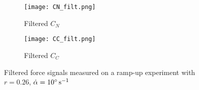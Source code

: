 \begin{figure}[h]
	\begin{subfigure}{.5\textwidth}
		\texttt{[image: CN\_filt.png]}
		\caption{Filtered $C_N$}
		\label{fig:CN_filt}
	\end{subfigure}%
	\begin{subfigure}{.5\textwidth}
		\texttt{[image: CC\_filt.png]}
		\caption{Filtered $C_C$}
		\label{fig:CC_filt}
	\end{subfigure}
	\caption{Filtered force signals measured on a ramp-up experiment with $r=0.26$, $\dot{\alpha} = 10 \si{\degree \per \second}$}
	\label{fig:forces_filt}
\end{figure}